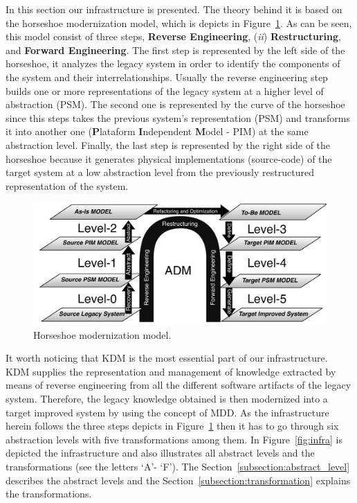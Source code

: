 In this section our infrastructure is presented. The theory behind it is based on the horseshoe modernization model, which is depicts in Figure~\ref{fig:horseshoe}. As can be seen, this model consist of three steps, \textbf{Reverse Engineering}, (\textit{ii}) \textbf{Restructuring}, and \textbf{Forward Engineering}. The first step is represented by the left side of the horseshoe, it analyzes the legacy system in order to identify the components of the system and their interrelationships. Usually the reverse engineering step builds one or more representations of the legacy system at a higher level of abstraction (PSM). The second one is represented by the curve of the horseshoe since this steps takes the previous system's representation (PSM) and transforms it into another one (\textbf{P}lataform \textbf{I}ndependent \textbf{M}odel - PIM) at the same abstraction level. Finally, the last step is represented by the right side of the horseshoe because it generates physical implementations (source-code) of the target system at a low abstraction level from the previously restructured representation of the system.

\begin{figure}[!h]
\centering
  \includegraphics[scale=0.6]{Figuras/horseShoeBOM}
\caption{Horseshoe modernization model.}
\label{fig:horseshoe}
\end{figure}

It worth noticing that KDM is the most essential part of our infrastructure. KDM supplies the representation and management of knowledge extracted by means of reverse engineering from all the different software artifacts of the legacy system. Therefore, the legacy knowledge obtained is then modernized into a target improved system by using the concept of MDD. As the infrastructure herein follows the three steps depicts in Figure~\ref{fig:horseshoe} then it has to go through six abstraction levels with five transformations among them. In Figure~\ref{fig:infra} is depicted the infrastructure and also illustrates all abstract levels and the transformations (see the letters `A'- `F'). The Section~\ref{subsection:abstract_level} describes the abstract levels and the Section~\ref{subsection:transformation} explains the transformations.

